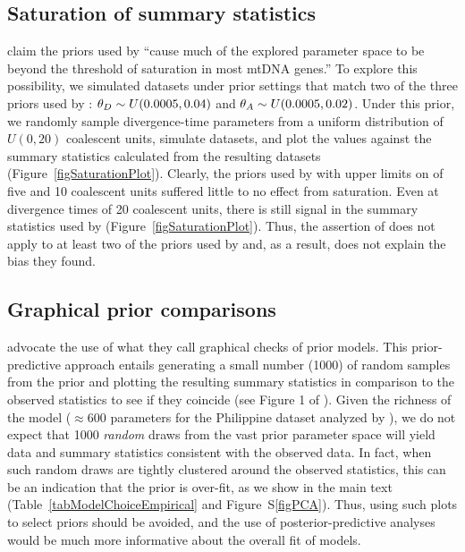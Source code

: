 \subsection{Saturation of summary statistics}
\citet{Hickerson2013} claim the priors used by \citet{Oaks2012} ``cause much of
the explored parameter space to be beyond the threshold of saturation in most
mtDNA genes.'' To explore this possibility, we simulated datasets under prior
settings that match two of the three priors used by \citet{Oaks2012}:
$\meanDescendantTheta{} \sim U(0.0005, 0.04)$ and $\ancestralTheta{} \sim
U(0.0005, 0.02)$.
Under this prior, we randomly sample divergence-time parameters from a uniform
distribution of $U(0, 20)$ coalescent units, simulate datasets, and plot the
\divt{} values against the summary statistics calculated from the resulting
datasets (Figure~\ref{figSaturationPlot}).
Clearly, the priors used by \citet{Oaks2012} with upper limits on \divt{} of five
and 10 coalescent units suffered little to no effect from saturation.
Even at divergence times of 20 coalescent units, there is still signal in the
summary statistics used by \msb (Figure~\ref{figSaturationPlot}).
Thus, the assertion of \citet{Hickerson2013} does not apply to at least
two of the priors used by \citet{Oaks2012} and, as a result, does not
explain the bias they found.

\subsection{Graphical prior comparisons}
\citet{Hickerson2013} advocate the use of what they call graphical checks of
prior models.
This prior-predictive approach entails generating a small number (1000) of
random samples from the prior and plotting the resulting summary statistics in
comparison to the observed statistics to see if they coincide (see Figure 1 of
\citet{Hickerson2013}).
Given the richness of the \msb model ($\approx 600$ parameters for the Philippine
dataset analyzed by \citet{Hickerson2013}), we do not expect that 1000
\emph{random} draws from the vast prior parameter space will yield data and
summary statistics consistent with the observed data.
In fact, when such random draws are tightly clustered around the observed
statistics, this can be an indication that the prior is over-fit, as we show in
the main text (Table~\ref{tabModelChoiceEmpirical} and Figure~S\ref{figPCA}).
Thus, using such plots to select priors should be avoided, and the use of
posterior-predictive analyses would be much more informative about the overall
fit of models.

